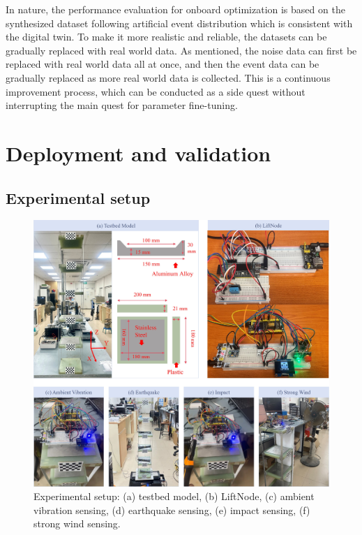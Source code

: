 \documentclass[a4paper,fleqn,numbers,sort&compress]{cas-sc}
\begin{document}
In nature, the performance evaluation for onboard optimization is based on the synthesized dataset following artificial event distribution which is consistent with the digital twin. To make it more realistic and reliable, the datasets can be gradually replaced with real world data. As mentioned, the noise data can first be replaced with real world data all at once, and then the event data can be gradually replaced as more real world data is collected. This is a continuous improvement process, which can be conducted as a side quest without interrupting the main quest for parameter fine-tuning.

\section{Deployment and validation}
\label{sec:deployment_validation}

\subsection{Experimental setup}

\begin{figure}[htbp]
    \centering
    \includegraphics[width=\linewidth]{Fig9.jpg}
    \caption{Experimental setup: (a) testbed model, (b) LiftNode, (c) ambient vibration sensing, (d) earthquake sensing, (e) impact sensing, (f) strong wind sensing.}
    \label{fig:Experimental Setup}
\end{figure}
\end{document}
